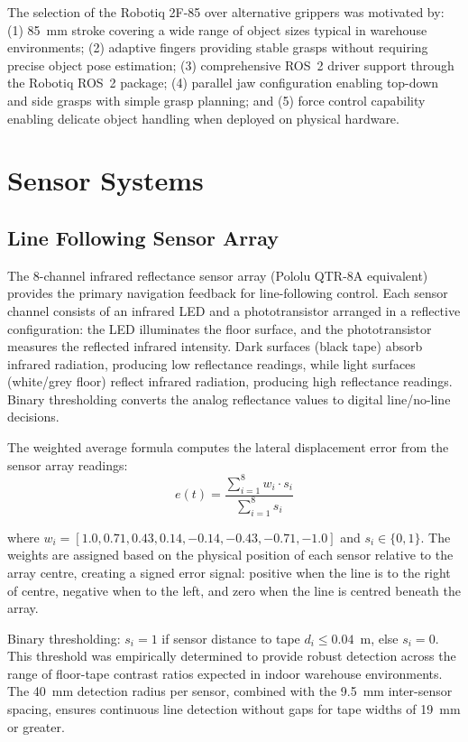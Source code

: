 \documentclass[12pt,a4paper,oneside]{report}
\begin{document}
The selection of the Robotiq 2F-85 over alternative grippers was motivated by: (1) 85~mm stroke covering a wide range of object sizes typical in warehouse environments; (2) adaptive fingers providing stable grasps without requiring precise object pose estimation; (3) comprehensive ROS~2 driver support through the Robotiq ROS~2 package; (4) parallel jaw configuration enabling top-down and side grasps with simple grasp planning; and (5) force control capability enabling delicate object handling when deployed on physical hardware.

\section{Sensor Systems}

\subsection{Line Following Sensor Array}

The 8-channel infrared reflectance sensor array (Pololu QTR-8A equivalent) provides the primary navigation feedback for line-following control. Each sensor channel consists of an infrared LED and a phototransistor arranged in a reflective configuration: the LED illuminates the floor surface, and the phototransistor measures the reflected infrared intensity. Dark surfaces (black tape) absorb infrared radiation, producing low reflectance readings, while light surfaces (white/grey floor) reflect infrared radiation, producing high reflectance readings. Binary thresholding converts the analog reflectance values to digital line/no-line decisions.

The weighted average formula computes the lateral displacement error from the sensor array readings:
\begin{equation}
e(t) = \frac{\sum_{i=1}^{8} w_i \cdot s_i}{\sum_{i=1}^{8} s_i}
\label{eq:weighted_error}
\end{equation}

where $w_i = [1.0, 0.71, 0.43, 0.14, -0.14, -0.43, -0.71, -1.0]$ and $s_i \in \{0, 1\}$. The weights are assigned based on the physical position of each sensor relative to the array centre, creating a signed error signal: positive when the line is to the right of centre, negative when to the left, and zero when the line is centred beneath the array.

Binary thresholding: $s_i = 1$ if sensor distance to tape $d_i \leq 0.04$~m, else $s_i = 0$. This threshold was empirically determined to provide robust detection across the range of floor-tape contrast ratios expected in indoor warehouse environments. The 40~mm detection radius per sensor, combined with the 9.5~mm inter-sensor spacing, ensures continuous line detection without gaps for tape widths of 19~mm or greater.
\end{document}
